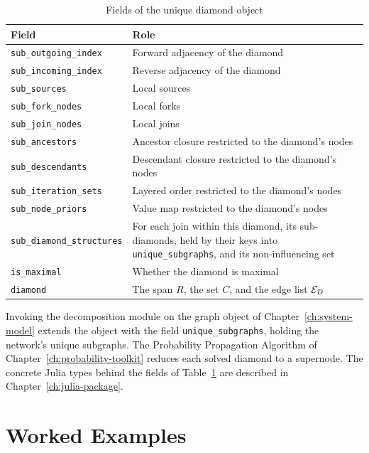 \documentclass[12pt]{report}
\begin{document}
\begin{table}[htbp]
\centering
\caption{Fields of the unique diamond object}
\label{tab:dd-selfsimilar}
\small
\renewcommand{\arraystretch}{1.15}
\begin{tabular}{|l|p{}|}
\hline
\textbf{Field} & \textbf{Role} \\
\hline
\texttt{sub\_outgoing\_index} & Forward adjacency of the diamond \\
\texttt{sub\_incoming\_index} & Reverse adjacency of the diamond \\
\texttt{sub\_sources} & Local sources \\
\texttt{sub\_fork\_nodes} & Local forks \\
\texttt{sub\_join\_nodes} & Local joins \\
\texttt{sub\_ancestors} & Ancestor closure restricted to the diamond's nodes \\
\texttt{sub\_descendants} & Descendant closure restricted to the diamond's nodes \\
\texttt{sub\_iteration\_sets} & Layered order restricted to the diamond's nodes \\
\texttt{sub\_node\_priors} & Value map restricted to the diamond's nodes \\
\texttt{sub\_diamond\_structures} & For each join within this diamond, its sub-diamonds, held by their keys into \texttt{unique\_subgraphs}, and its non-influencing set \\
\texttt{is\_maximal} & Whether the diamond is maximal \\
\texttt{diamond} & The span $R$, the set $C$, and the edge list $\mathcal{E}_D$ \\
\hline
\end{tabular}
\end{table}

Invoking the decomposition module on the graph object of Chapter~\ref{ch:system-model} extends the object with the field \texttt{unique\_subgraphs}, holding the network's unique subgraphs. The Probability Propagation Algorithm of Chapter~\ref{ch:probability-toolkit} reduces each solved diamond to a supernode. The concrete Julia types behind the fields of Table~\ref{tab:dd-selfsimilar} are described in Chapter~\ref{ch:julia-package}.

\section{Worked Examples}
\label{sec:dd-examples}
\end{document}
